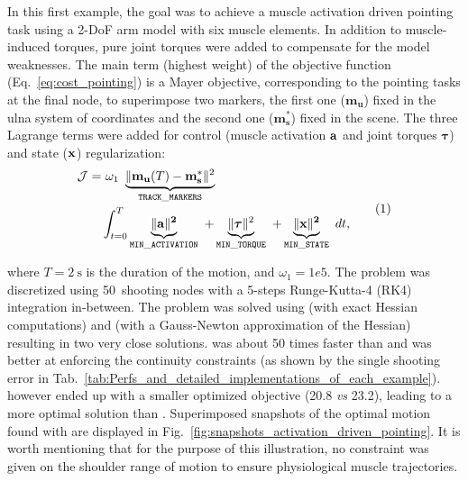 %
In this first example, the goal was to achieve a muscle activation driven pointing task using a 2-DoF arm model with six muscle elements. 
In addition to muscle-induced torques, pure joint torques were added to compensate for the model weaknesses.
The main term (highest weight) of the objective function (Eq.~\ref{eq:cost_pointing}) is a Mayer objective, corresponding to the pointing tasks at the final node, to superimpose two markers, the first one ($\mathbf{m_u}$) fixed in the ulna system of coordinates and the second one ($\mathbf{m^*_s}$) fixed in the scene.
The three Lagrange terms  were added for control (muscle activation $\bf{a}$ and joint torques $\boldsymbol{\tau}$) and state ($\bf{x}$) regularization:
\[
\begin{aligned}
	\mathcal{J} = 	&~\omega_1~\underbrace{\|\mathbf{m_u}(T)-\mathbf{m^*_s}\|^2}_{\mathtt{TRACK\_MARKERS}}~\\
	&\int_{t=0}^T\underbrace{\|\bf{a}\|^2}_{\mathtt{MIN\_ACTIVATION}}~
	+\underbrace{\|\boldsymbol\tau\|^2}_{\mathtt{MIN\_TORQUE}}~
	+\underbrace{\|\bf{x}\|^2}_{\mathtt{MIN\_STATE}}~ dt,
\end{aligned}
\addtag
\label{eq:cost_pointing}
\]

\noindent where $T\!=\!\SI{2}{\second}$ is the duration of the motion, and $\omega_1\!=\!1e5$.
The problem was discretized using 50~shooting nodes with a 5-steps Runge-Kutta-4 (RK4) integration in-between.
The problem was solved using \ipopt (with exact Hessian computations) and \acados (with a Gauss-Newton approximation of the Hessian) resulting in two very close solutions.
\acados was about 50 times faster than \ipopt and was better at enforcing the continuity constraints (as shown by the single shooting error in Tab.~\ref{tab:Perfs_and_detailed_implementations_of_each_example}).
\ipopt however ended up with a smaller optimized objective (20.8 \textit{vs} 23.2), leading to a more optimal solution than \acados. 
Superimposed snapshots of the optimal motion found with \acados are displayed in Fig.~\ref{fig:snapshots_activation_driven_pointing}.
It is worth mentioning that for the purpose of this illustration, no constraint was given on the shoulder range of motion to ensure physiological muscle trajectories. 
